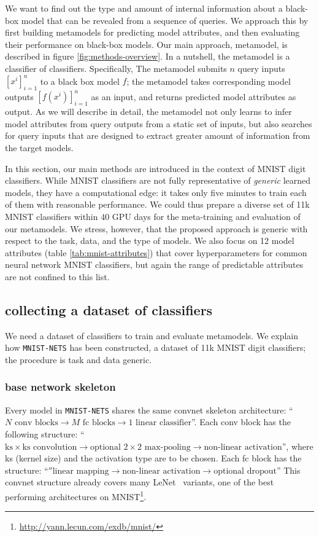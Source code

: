 \documentclass{article} %
\newcommand{\metamnist}{\texttt{MNIST-NETS}\xspace}
\begin{document}
We want to find out the type and amount of internal information about a black-box model that can be revealed from a sequence of queries. We approach this by first building metamodels for predicting model attributes, and then evaluating their performance on black-box models. Our main approach, metamodel, is described in figure \ref{fig:methods-overview}. In a nutshell, the metamodel is a classifier of classifiers. Specifically, The metamodel submits $n$ query inputs $\left[x^i\right]_{i=1}^n$ to a black box model $f$; the metamodel takes corresponding model outputs $\left[f(x^i)\right]_{i=1}^n$ as an input, and returns predicted model attributes as output. As we will describe in detail, the metamodel not only learns to infer model attributes from query outputs from a static set of inputs, but also searches for query inputs that are designed to extract greater amount of information from the target models.

In this section, our main methods are introduced in the context of MNIST digit classifiers. While MNIST classifiers are not fully representative of \emph{generic} learned models, they have a computational edge: it takes only five minutes to train each of them with reasonable performance. We could thus prepare a diverse set of 11k MNIST classifiers within 40 GPU days for the meta-training and evaluation of our metamodels. We stress, however, that the proposed approach is generic with respect to the task, data, and the type of models. We also focus on 12 model attributes (table \ref{tab:mnist-attributes}) that cover hyperparameters for common neural network MNIST classifiers, but again the range of predictable attributes are not confined to this list. 

\subsection{collecting a dataset of classifiers}
\label{subsec:dataset}

We need a dataset of classifiers to train and evaluate metamodels. We explain how \metamnist has been constructed, a dataset of 11k MNIST digit classifiers; the procedure is task and data generic.

\subsubsection*{base network skeleton}

Every model in \metamnist shares the same convnet skeleton architecture: ``$N\,\,\text{conv blocks}\rightarrow M\,\,\text{fc blocks}\rightarrow 1\,\,\text{linear classifier}$''. Each conv block has the following structure: ``$\text{ks}\times\text{ks}\,\,\text{convolution}\rightarrow
\text{optional}\,\,2\times2\,\,\text{max-pooling}\rightarrow\text{non-linear activation}$'', where ks (kernel size) and the activation type are to be chosen. Each fc block has the structure: ``$''
\text{linear mapping}\rightarrow
\text{non-linear activation}\rightarrow
\text{optional dropout}
$''
This convnet structure already covers many LeNet~\citep{lenet} variants, one of the best performing architectures on MNIST\footnote{\url{http://yann.lecun.com/exdb/mnist/}}.
\end{document}
